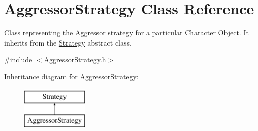 \hypertarget{classAggressorStrategy}{}\section{Aggressor\+Strategy Class Reference}
\label{classAggressorStrategy}


Class representing the Aggressor strategy for a particular \hyperlink{classCharacter}{Character} Object. It inherits from the \hyperlink{classStrategy}{Strategy} abstract class.  




{\ttfamily \#include $<$Aggressor\+Strategy.\+h$>$}

Inheritance diagram for Aggressor\+Strategy\+:\begin{figure}[H]
\begin{center}
\leavevmode
\includegraphics[height=2.000000cm]{classAggressorStrategy}
\end{center}
\end{figure}
